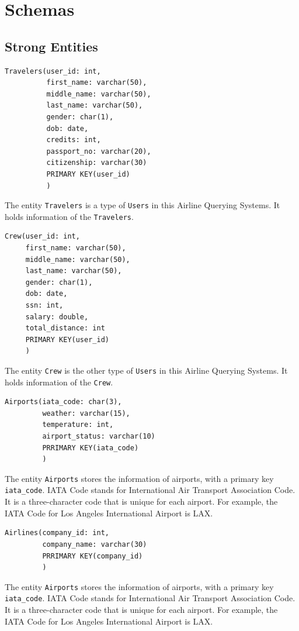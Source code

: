 \documentclass{article}
\begin{document}
	\section{Schemas}
	
	\subsection{Strong Entities}
	\begin{lstlisting}[keepspaces=true]
Travelers(user_id: int,
          first_name: varchar(50),
          middle_name: varchar(50),
          last_name: varchar(50),
          gender: char(1),
          dob: date,
          credits: int,
          passport_no: varchar(20), 
          citizenship: varchar(30)
          PRIMARY KEY(user_id)
          )
	\end{lstlisting}    
	The entity \texttt{Travelers} is a type of \texttt{Users} in this Airline Querying Systems. It holds information of the \texttt{Travelers}.
	
	\begin{lstlisting}[keepspaces=true]
Crew(user_id: int,
     first_name: varchar(50),
     middle_name: varchar(50),
     last_name: varchar(50),
     gender: char(1),
     dob: date,
     ssn: int, 
     salary: double, 
     total_distance: int
     PRIMARY KEY(user_id)
     )
	\end{lstlisting}    
	The entity \texttt{Crew} is the other type of \texttt{Users} in this Airline Querying Systems. It holds information of the \texttt{Crew}.
	
	\begin{lstlisting}[keepspaces=true]
Airports(iata_code: char(3), 
         weather: varchar(15),
         temperature: int,
         airport_status: varchar(10)
         PRRIMARY KEY(iata_code)
         )
	\end{lstlisting}    
	The entity \texttt{Airports} stores the information of airports, with a primary key \texttt{iata\_code}. IATA Code stands for International Air Transport Association Code. It is a three-character code that is unique for each airport. For example, the IATA Code for Los Angeles International Airport is LAX.
	
	\begin{lstlisting}[keepspaces=true]             
Airlines(company_id: int,
         company_name: varchar(30)
         PRRIMARY KEY(company_id)
         )
	\end{lstlisting}    
	The entity \texttt{Airports} stores the information of airports, with a primary key \texttt{iata\_code}. IATA Code stands for International Air Transport Association Code. It is a three-character code that is unique for each airport. For example, the IATA Code for Los Angeles International Airport is LAX.
	
\end{document}
